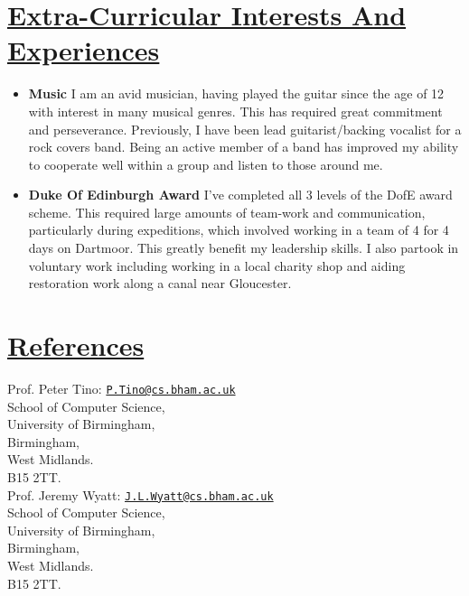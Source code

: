 \documentclass[11pt]{article}
\begin{document}
	\vspace{-20pt}
	\hspace{-100pt}\section*{\underline{Extra-Curricular Interests And Experiences}}
			\begin{itemize}
				\item \textbf{Music} I am an avid musician, having played the guitar since the age of 12 with interest in many musical genres. This has required great commitment and perseverance. Previously, I have been lead guitarist/backing vocalist for a rock covers band. Being an active member of a band has improved my ability to cooperate well within a group and listen to those around me. 
				\item \textbf{Duke Of Edinburgh Award} I've completed all 3 levels of the DofE award scheme. This required large amounts of team-work and communication, particularly during expeditions, which involved working in a team of 4 for 4 days on Dartmoor. This greatly benefit my leadership skills. I also partook in voluntary work including working in a local charity shop and aiding restoration work along a canal near Gloucester.
			\end{itemize}

				
	\vspace{-20pt}
	\hspace{-100pt}\section*{\underline{References}}	
				\begin{multicols}{2}
					\noindent
					Prof. Peter Tino:  \href{mailto:P.Tino@cs.bham.ac.uk}{\nolinkurl{P.Tino@cs.bham.ac.uk}}\\
					School of Computer Science,\\
					University of Birmingham,\\
					Birmingham, \\
					West Midlands.\\
					B15 2TT.\\
	
					\noindent
					Prof. Jeremy Wyatt: \href{mailto:J.L.Wyatt@cs.bham.ac.uk}{\nolinkurl{J.L.Wyatt@cs.bham.ac.uk}}\\
					School of Computer Science,\\
					University of Birmingham,\\
					Birmingham,\\
					West Midlands.\\
					B15 2TT.\\
				\end{multicols}
\end{document}
